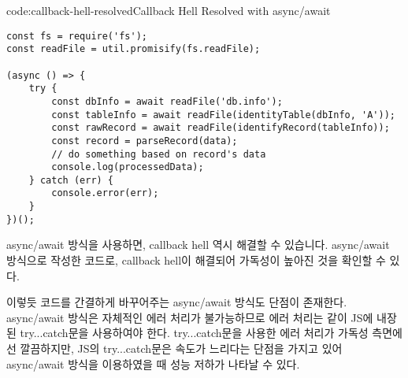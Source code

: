 \begin{codeenv}{code:callback-hell-resolved}{Callback Hell Resolved with async/await}\begin{verbatim}
const fs = require('fs');
const readFile = util.promisify(fs.readFile);

(async () => {
    try {
        const dbInfo = await readFile('db.info');
        const tableInfo = await readFile(identityTable(dbInfo, 'A'));
        const rawRecord = await readFile(identifyRecord(tableInfo));
        const record = parseRecord(data);
        // do something based on record's data
        console.log(processedData);
    } catch (err) {
        console.error(err);
    }
})();
\end{verbatim}
\end{codeenv}

async/await 방식을 사용하면, callback hell 역시 해결할 수 있습니다. \는 \을 async/await 방식으로 작성한 코드로, callback hell이 해결되어 가독성이 높아진 것을 확인할 수 있다.

이렇듯 코드를 간결하게 바꾸어주는 async/await 방식도 단점이 존재한다. async/await 방식은 자체적인 에러 처리가 불가능하므로 에러 처리는 \과 같이 JS에 내장된 try...catch문을 사용하여야 한다. try...catch문을 사용한 에러 처리가 가독성 측면에선 깔끔하지만, JS의 try...catch문은 속도가 느리다는 단점을 가지고 있어 async/await 방식을 이용하였을 때 성능 저하가 나타날 수 있다.
